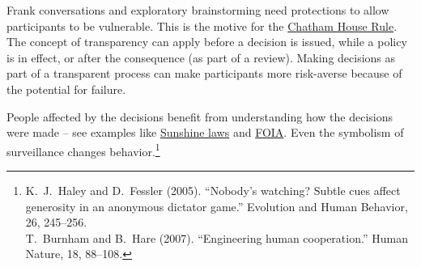 Frank conversations and exploratory brainstorming need protections to allow participants to be vulnerable. 
This is the motive for the \href{https://en.wikipedia.org/wiki/Chatham_House_Rule}{Chatham House Rule}. 
\iftoggle{WPinmargin}{\marginpar{$>$Wikipedia: Chatham House Rule}}{}
The concept of transparency can apply before a decision is issued, while a policy is in effect, or after the consequence (as part of a review). 
Making decisions as part of a transparent process can make participants more risk-averse because of the potential for failure.

People affected by the decisions benefit from understanding how the decisions were made -- see examples like 
\href{https://en.wikipedia.org/wiki/Government_in_the_Sunshine_Act}{Sunshine laws} and
\href{https://en.wikipedia.org/wiki/Freedom_of_Information_Act_(United_States)}{FOIA}. 
\iftoggle{WPinmargin}{\marginpar{$>$Wikipedia: Freedom of Information Act}}{}
Even the symbolism of surveillance changes behavior.\footnote{K.~J.~Haley and D.~Fessler (2005). ``Nobody’s watching? Subtle cues affect generosity in an anonymous dictator game.'' Evolution and Human Behavior, 26, 245–256.\\
T.~Burnham and B.~Hare (2007). ``Engineering human cooperation.'' Human Nature, 18, 88–108.}



